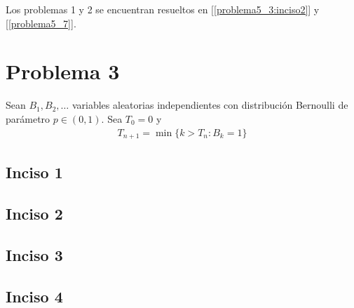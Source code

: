 Los problemas 1 y 2 se encuentran resueltos en [\ref{problema5_3:inciso2}] y [\ref{problema5_7}].

\section{Problema 3}
Sean $B_1, B_2, \dots$ variables aleatorias independientes con distribución Bernoulli de parámetro $p \in (0,1)$.
Sea $T_0 = 0$ y
\begin{align}
    T_{n+1} = \min\{k>T_n : B_k = 1\}
\end{align}
    \subsection{Inciso 1}
        
        \newpage
        
    \subsection{Inciso 2}
        
        \newpage
        
    \subsection{Inciso 3}
        
        \newpage
        
    \subsection{Inciso 4}
        
